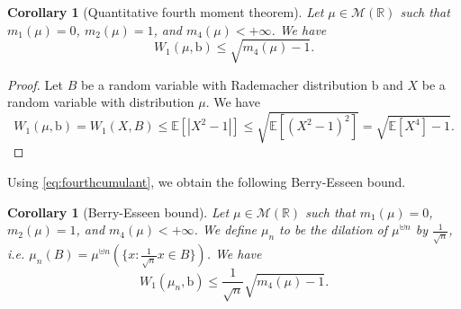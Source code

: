 \documentclass[10pt, reqno]{amsart}
\numberwithin{equation}{section}
\theoremstyle{definition}
\theoremstyle{plain}
\newtheorem{corollary}[definition]{Corollary}
\theoremstyle{remark}
\newcommand{\1}{\mathbbm{1}}
\begin{document}
\begin{corollary}[Quantitative fourth moment theorem]Let $\mu\in \mathcal{M}(\mathbb{R})$ such that $m_1(\mu) = 0$, $m_2(\mu) = 1$, and $m_4(\mu) < +\infty$. We have
$$W_1(\mu,\mathbb{\mathrm{b}})\leq \sqrt{m_4(\mu)-1}.$$
\end{corollary}
\begin{proof}Let $B$ be a random variable  with Rademacher distribution $\mathbb{\mathrm{b}}$ and $X$ be a random variable  with distribution $\mu$. We have
$$W_1(\mu,\mathbb{\mathrm{b}})=W_1(X,B)\leq \mathbb{E}\left[\left|X^2-1\right|\right]\leq \sqrt{\mathbb{E}\left[\left(X^2-1\right)^2\right]}=\sqrt{\mathbb{E}[X^4]-1}.$$
\end{proof}
Using \eqref{eq:fourthcumulant}, we obtain the following Berry-Esseen bound.
\begin{corollary}[Berry-Esseen bound]Let $\mu\in \mathcal{M}(\mathbb{R})$ such that $m_1(\mu) = 0$, $m_2(\mu) = 1$,
and $m_4(\mu) < +\infty$.  We define $\mu_n$ to be the dilation of $\mu^{\uplus n}$ by $\frac{1}{\sqrt{n}}$, i.e. $\mu_n(B)=\mu^{\uplus n}(\{x:\frac{1}{\sqrt{n}}x\in B\})$. We have
$$W_1(\mu_n,\mathbb{\mathrm{b}})\leq \frac{1}{\sqrt{n}}\sqrt{m_4(\mu)-1}.$$
\end{corollary}
\end{document}
